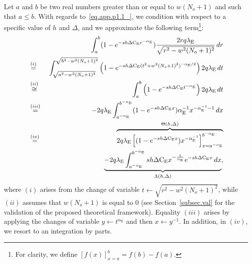 \documentclass[10pt,journal,a4paper]{IEEEtran}
\begin{document}
Let $a$ and $b$ be two real numbers greater than or equal to $w(N_o+1)$ and such that $a \leq b$. With regards to~\eqref{eq.app.p1.1_}, we condition with respect to a specific value of $h$ and $\Delta$, and we approximate the following term\footnote{For clarity, we define $[f(x)]_{x=a}^b = f(b) - f(a)$. }:
\setlength{\arraycolsep}{0.0em} 
\begin{eqnarray}
&&\int_{a}^{b} (1-e^{-s h \Delta \mathrm{C_E} r^{-\alpha_\mathrm{E}}}) \frac{2 r q \lambda_\mathrm{E}}{\sqrt{r^2 - w^2(N_o+1)^2}} \, dr\notag\\
&{}\stackrel{(i)}{=}{}& \int_{\sqrt{a^2-w^2(N_o+1)^2}}^{\sqrt{b^2-w^2(N_o+1)^2}} \left(1-e^{-s h \Delta \mathrm{C_E} (t^2+w^2(N_o+1)^2)^{-\alpha_\mathrm{E}/2}}\right) 2 q \lambda_\mathrm{E} \, dt \nonumber\\
&{}\stackrel{(ii)}{\cong}{}& \int_{a}^{b} \left(1-e^{-s h \Delta \mathrm{C_E} t^{-\alpha_\mathrm{E}}}\right) 2 q \lambda_\mathrm{E} \, dt \label{eq.R.relaxed}\\
&{}\stackrel{(iii)}{=}{}& -2 q \lambda_\mathrm{E} \int_{a^{-\alpha_\mathrm{E}}}^{b^{-\alpha_\mathrm{E}}} (1-e^{-s h \Delta \mathrm{C_E} x}) \alpha_\mathrm{E}^{-1} x^{-\alpha_\mathrm{E}^{-1} - 1} \, dx \nonumber\\
&{}\stackrel{(iv)}{=}{}& \overbrace{2 q \lambda_\mathrm{E} \left[(1-e^{-s h \Delta \mathrm{C_E} x}) x^{-\alpha_\mathrm{E}^{-1}}\right]_{x = a^{-\alpha_\mathrm{E}}}^{b^{-\alpha_\mathrm{E}}}}^{\Theta(h,\Delta)}\notag\\
&& \underbrace{-2 q \lambda_\mathrm{E} \int_{a^{-\alpha_\mathrm{E}}}^{b^{-\alpha_\mathrm{E}}} s h \Delta \mathrm{C_E} x^{-\frac{1}{\alpha_\mathrm{E}}} e^{-s h \Delta \mathrm{C_E} x} \, dx}_{\Lambda(h,\Delta)},\label{eq.intApp}
\end{eqnarray}
where $(i)$ arises from the change of variable \mbox{$t \leftarrow \sqrt{r^2 - w^2(N_o+1)^2}$}, while $(ii)$ assumes that $w(N_o+1)$ is equal to $0$ (see Section~\ref{subsec.val} for the validation of the proposed theoretical framework). Equality $(iii)$ arises by applying the changes of variable $y \leftarrow t^{\alpha_{\mathrm{E}}}$ and then $x \leftarrow y^{-1}$. In addition, in $(iv)$, we resort to an integration by parts.
\end{document}
